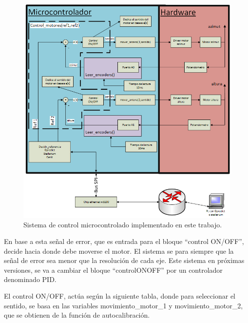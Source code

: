 \begin{figure}[pt]
	\hspace{-30mm}
	\includegraphics{control_realimentado}
	\caption{Sistema de control microcontrolado implementado en este trabajo.}
	\label{fig:sist_control_real}
\end{figure}

 En base a esta señal de error, que es entrada para el bloque ``control ON/OFF'', decide hacia donde debe moverse el motor. El sistema se para siempre que la señal de error sea menor que la resolución de cada eje. Este sistema en próximas versiones, se va a cambiar el bloque ``controlONOFF'' por un controlador denominado PID. 

 El control ON/OFF, actúa según la siguiente tabla, donde para seleccionar el sentido, se basa en las variables movimiento\_motor\_1 y movimiento\_motor\_2, que se obtienen de la función de autocalibración. 
 
